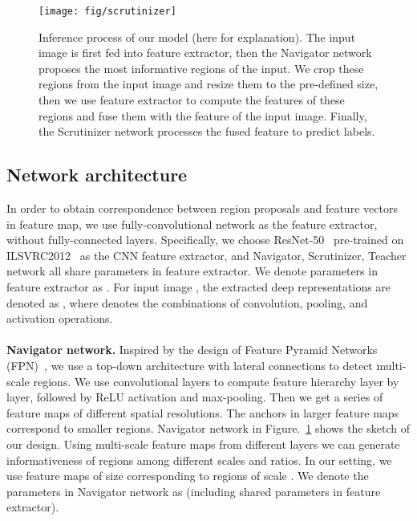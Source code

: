\documentclass[runningheads]{llncs}
\begin{document}
\begin{figure}[ht]
\begin{center}
\texttt{[image: fig/scrutinizer]}
\end{center}
   \caption{Inference process of our model (here  for explanation). The input image is first fed into feature extractor, then the Navigator network proposes the most informative regions of the input. We crop these regions from the input image and resize them to the pre-defined size, then we use feature extractor to compute the features of these regions and fuse them with the feature of the input image. Finally, the Scrutinizer network processes the fused feature to predict labels.}
\label{scrutinizer}
\end{figure}

\subsection{Network architecture}\label{sec_architecture}
In order to obtain correspondence between region proposals and feature vectors in feature map, we use fully-convolutional network as the feature extractor, without fully-connected layers. Specifically, we choose ResNet-50~\cite{he2016deep} pre-trained on ILSVRC2012~\cite{ILSVRC15} as the CNN feature extractor, and Navigator, Scrutinizer, Teacher network all share parameters in feature extractor. We denote parameters in feature extractor as . For input image , the extracted deep representations are denoted as , where  denotes the combinations of convolution, pooling, and activation operations.\\\\
\textbf{Navigator network.}
Inspired by the design of Feature Pyramid Networks (FPN)~\cite{Lin_2017_CVPR}, we use a top-down architecture with lateral connections to detect multi-scale regions. We use convolutional layers to compute feature hierarchy layer by layer, followed by ReLU activation and max-pooling. Then we get a series of feature maps of different spatial resolutions. The anchors in larger feature maps correspond to smaller regions. Navigator network in Figure.~\ref{scrutinizer} shows the sketch of our design. Using multi-scale feature maps from different layers we can generate informativeness of regions among different scales and ratios. In our setting, we use feature maps of size  corresponding to regions of  scale . We denote the parameters in Navigator network as  (including shared parameters in feature extractor).\\\\
\end{document}

